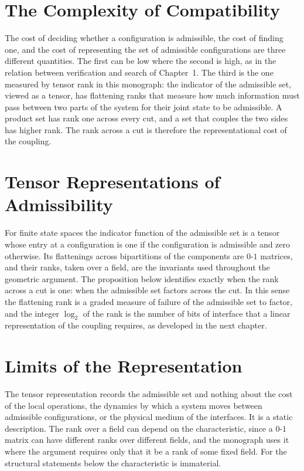 \documentclass[11pt,letterpaper]{report}
\theoremstyle{plain}
\theoremstyle{definition}
\theoremstyle{remark}
\begin{document}
\section{The Complexity of Compatibility}

The cost of deciding whether a configuration is admissible, the cost of finding one, and the cost of representing the set of admissible configurations are three different quantities. The first can be low where the second is high, as in the relation between verification and search of Chapter~1. The third is the one measured by tensor rank in this monograph: the indicator of the admissible set, viewed as a tensor, has flattening ranks that measure how much information must pass between two parts of the system for their joint state to be admissible. A product set has rank one across every cut, and a set that couples the two sides has higher rank. The rank across a cut is therefore the representational cost of the coupling.

\section{Tensor Representations of Admissibility}

For finite state spaces the indicator function of the admissible set is a tensor whose entry at a configuration is one if the configuration is admissible and zero otherwise. Its flattenings across bipartitions of the components are $0$-$1$ matrices, and their ranks, taken over a field, are the invariants used throughout the geometric argument. The proposition below identifies exactly when the rank across a cut is one: when the admissible set factors across the cut. In this sense the flattening rank is a graded measure of failure of the admissible set to factor, and the integer $\log_2$ of the rank is the number of bits of interface that a linear representation of the coupling requires, as developed in the next chapter.

\section{Limits of the Representation}

The tensor representation records the admissible set and nothing about the cost of the local operations, the dynamics by which a system moves between admissible configurations, or the physical medium of the interfaces. It is a static description. The rank over a field can depend on the characteristic, since a $0$-$1$ matrix can have different ranks over different fields, and the monograph uses it where the argument requires only that it be a rank of some fixed field. For the structural statements below the characteristic is immaterial.
\end{document}
